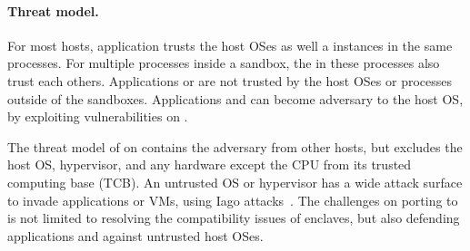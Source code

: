\paragraph{Threat model.}
For most hosts, application trusts the host OSes as well a \libos{} instances in the same processes.
For multiple processes inside a sandbox,
the \liboses{} in these processes
also trust each others.
Applications or \liboses{} are not trusted by the host OSes or processes outside of the sandboxes.
Applications and \liboses{}
can become adversary to the host OS,
by exploiting vulnerabilities on \thehostabi{}.




The threat model of \graphene{} on \sgx{}
contains the adversary from other hosts, but excludes
the host OS, hypervisor, and any hardware except the CPU from its trusted computing base (TCB).
An untrusted OS or hypervisor
has a wide attack surface to invade applications or VMs,
using Iago attacks~\cite{checkoway13iago}.
The challenges on porting \graphene{} to \sgx{} is not limited to resolving the compatibility issues of enclaves, but also defending applications and \liboses{} against untrusted host OSes.







